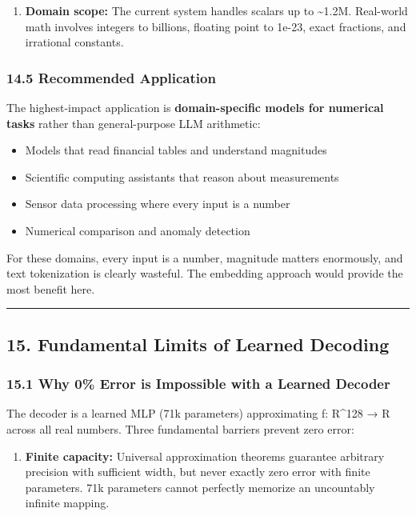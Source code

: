 \documentclass[11pt]{article}
\begin{document}
\begin{enumerate}
\item \textbf{Domain scope:} The current system handles scalars up to \textasciitilde{}1.2M. Real-world math involves integers to billions, floating point to 1e-23, exact fractions, and irrational constants.
\end{enumerate}


\subsubsection*{14.5 Recommended Application}


The highest-impact application is \textbf{domain-specific models for numerical tasks} rather than general-purpose LLM arithmetic:


\begin{itemize}
\item Models that read financial tables and understand magnitudes
\item Scientific computing assistants that reason about measurements
\item Sensor data processing where every input is a number
\item Numerical comparison and anomaly detection
\end{itemize}


For these domains, every input is a number, magnitude matters enormously, and text tokenization is clearly wasteful. The embedding approach would provide the most benefit here.


\noindent\rule{\textwidth}{0.4pt}


\subsection*{15. Fundamental Limits of Learned Decoding}


\subsubsection*{15.1 Why 0\% Error is Impossible with a Learned Decoder}


The decoder is a learned MLP (71k parameters) approximating f: R\textasciicircum{}128 → R across all real numbers. Three fundamental barriers prevent zero error:


\begin{enumerate}
\item \textbf{Finite capacity:} Universal approximation theorems guarantee arbitrary precision with sufficient width, but never exactly zero error with finite parameters. 71k parameters cannot perfectly memorize an uncountably infinite mapping.
\end{enumerate}
\end{document}
